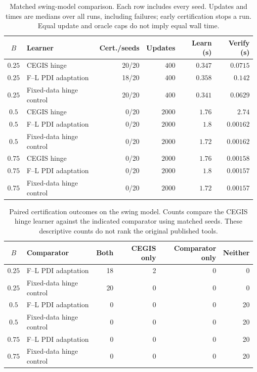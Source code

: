 \begin{table}[t]
\centering\small
\caption{Matched swing-model comparison. Each row includes every seed. Updates and times are medians over all runs, including failures; early certification stops a run. Equal update and oracle caps do not imply equal wall time.}
\label{tab:application}
\begin{tabular}{clrrrr}
\hline
$B$ & Learner & Cert./seeds & Updates & Learn (s) & Verify (s) \\
\hline
$0.25$ & CEGIS hinge & 20/20 & $400$ & $0.347$ & $0.0715$ \\
$0.25$ & F--L PDI adaptation & 18/20 & $400$ & $0.358$ & $0.142$ \\
$0.25$ & Fixed-data hinge control & 20/20 & $400$ & $0.341$ & $0.0629$ \\
$0.5$ & CEGIS hinge & 0/20 & $2000$ & $1.76$ & $2.74$ \\
$0.5$ & F--L PDI adaptation & 0/20 & $2000$ & $1.8$ & $0.00162$ \\
$0.5$ & Fixed-data hinge control & 0/20 & $2000$ & $1.72$ & $0.00162$ \\
$0.75$ & CEGIS hinge & 0/20 & $2000$ & $1.76$ & $0.00158$ \\
$0.75$ & F--L PDI adaptation & 0/20 & $2000$ & $1.8$ & $0.00157$ \\
$0.75$ & Fixed-data hinge control & 0/20 & $2000$ & $1.72$ & $0.00157$ \\
\hline
\end{tabular}
\end{table}

\begin{table}[t]
\centering\small
\caption{Paired certification outcomes on the swing model. Counts compare the CEGIS hinge learner against the indicated comparator using matched seeds. These descriptive counts do not rank the original published tools.}
\label{tab:applicationpaired}
\begin{tabular}{clrrrr}
\hline
$B$ & Comparator & Both & CEGIS only & Comparator only & Neither \\
\hline
$0.25$ & F--L PDI adaptation & 18 & 2 & 0 & 0 \\
$0.25$ & Fixed-data hinge control & 20 & 0 & 0 & 0 \\
$0.5$ & F--L PDI adaptation & 0 & 0 & 0 & 20 \\
$0.5$ & Fixed-data hinge control & 0 & 0 & 0 & 20 \\
$0.75$ & F--L PDI adaptation & 0 & 0 & 0 & 20 \\
$0.75$ & Fixed-data hinge control & 0 & 0 & 0 & 20 \\
\hline
\end{tabular}
\end{table}

